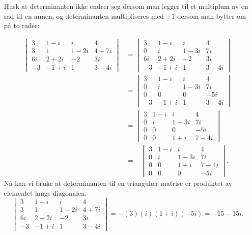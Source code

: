 \documentclass[notitlepage,a4paper,12pt,norsk]{IMFeksamen}
\newcommand{\0}{\V{0}}
\newcommand{\oppgslutt}{
\begin{center}
\pgfornament[width=6cm]{88}
\end{center}
}
\newenvironment{losning}{\begin{oppgave}}{\oppgslutt\end{oppgave}}
\begin{document}
\begin{losning}
Husk at determinanten ikke endrer seg dersom man legger til et multiplum av en rad til en annen, og determinanten multipliseres med $-1$ dersom man bytter om på to rader:

\begin{align*}
\begin{vmatrix}
3  &  1 - i  & i      & 4      \\
3  &  1      & 1 - 2i & 4 + 7i \\
6i &  2 + 2i & -2     & 3i     \\
-3 & -1 + i  & 1      & 3 - 4i
\end{vmatrix} &=
\begin{vmatrix}
3  &  1 - i   & i      & 4  \\
0  &  i       & 1 - 3i & 7i \\
6i &  2 + 2i  & -2     & 3i \\
-3 & -1 + i   & 1      & 3 - 4i
\end{vmatrix}\\ &=
\begin{vmatrix}
3  &  1 - i  & i      & 4  \\
0  &  i      & 1 - 3i & 7i \\
0  &  0      & 0     & -5i \\
-3 & -1 + i  & 1     & 3 - 4i
\end{vmatrix}\\ &=
\begin{vmatrix}
3 &  1 - i  & i      & 4  \\
0 &  i      & 1 - 3i & 7i \\
0 &  0      & 0      & -5i\\
0 &  0      & 1+i    & 7 - 4i
\end{vmatrix}\\ &=
-\begin{vmatrix}
3 &  1 - i  & i      & 4     \\
0 &  i      & 1 - 3i & 7i    \\
0 &  0      & 1+i    & 7 - 4i\\
0 &  0      & 0      & -5i
\end{vmatrix}.
\end{align*}
Nå kan vi bruke at determinanten til en triangulær matrise er produktet av elementet langs diagonalen:
\[
\begin{vmatrix}
3  &  1 - i  & i      & 4      \\
3  &  1      & 1 - 2i & 4 + 7i \\
6i &  2 + 2i & -2     & 3i     \\
-3 & -1 + i  & 1      & 3 - 4i
\end{vmatrix} 
=-(3)(i)(1+i)(-5i)=-15-15i.
\]

\end{losning}
\end{document}
